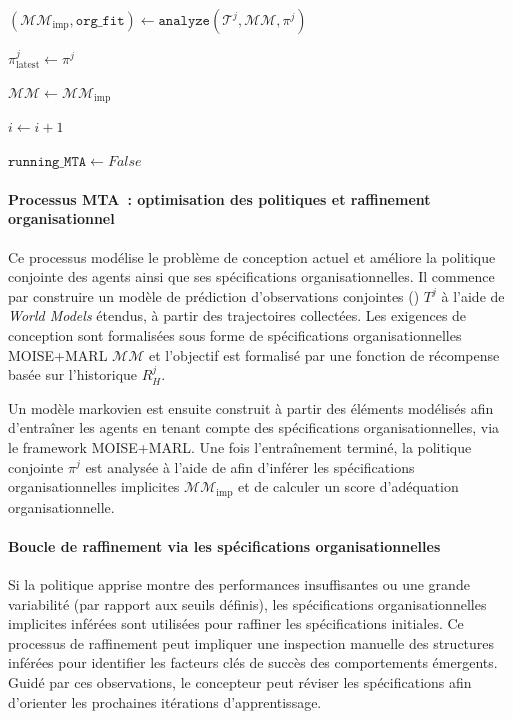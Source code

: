 \begin{algorithm}[H]
{{    \vspace{0.5em}
    $(\mathcal{MM}_{\text{imp}}, \texttt{org\_fit}) \gets \texttt{analyze}(\mathcal{T}^j, \mathcal{MM}, \pi^j)$ \;

    $\pi^j_{\text{latest}} \gets \pi^j$ 

    $\mathcal{MM} \gets \mathcal{MM}_{\text{imp}}$ \;

    $i \gets i + 1$

    }

    $\texttt{running\_MTA} \gets False$ 

    }
\end{algorithm}

\paragraph{Processus MTA~: optimisation des politiques et raffinement organisationnel}

Ce processus modélise le problème de conception actuel et améliore la politique conjointe des agents ainsi que ses spécifications organisationnelles. Il commence par construire un modèle de prédiction d'observations conjointes () $T^j$ à l'aide de \textit{World Models} étendus, à partir des trajectoires collectées. Les exigences de conception sont formalisées sous forme de spécifications organisationnelles MOISE+MARL $\mathcal{MM}$ et l'objectif est formalisé par une fonction de récompense basée sur l'historique $R^j_H$.

Un modèle markovien est ensuite construit à partir des éléments modélisés afin d'entraîner les agents en tenant compte des spécifications organisationnelles, via le framework MOISE+MARL. Une fois l'entraînement terminé, la politique conjointe $\pi^j$ est analysée à l'aide de  afin d'inférer les spécifications organisationnelles implicites $\mathcal{MM}_{\text{imp}}$ et de calculer un score d'adéquation organisationnelle.

\paragraph{Boucle de raffinement via les spécifications organisationnelles}

Si la politique apprise montre des performances insuffisantes ou une grande variabilité (par rapport aux seuils définis), les spécifications organisationnelles implicites inférées sont utilisées pour raffiner les spécifications initiales. Ce processus de raffinement peut impliquer une inspection manuelle des structures inférées pour identifier les facteurs clés de succès des comportements émergents. Guidé par ces observations, le concepteur peut réviser les spécifications afin d'orienter les prochaines itérations d'apprentissage.

